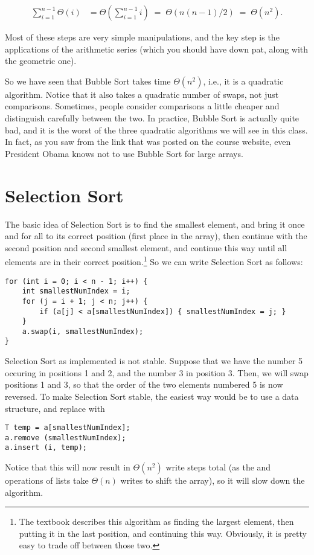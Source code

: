 \begin{align*}
\sum_{i=1}^{n-1} \Theta (i) 
& = \Theta ( \sum_{i=1}^{n-1} i )
\;  = \; \Theta ( n (n - 1) / 2)
\;  = \; \Theta ( n^{2} ).
\end{align*}

Most of these steps are very simple manipulations, and the key step is
the applications of the arithmetic series (which you should have down
pat, along with the geometric one). 

So we have seen that Bubble Sort takes time $\Theta(n^2)$, i.e., it is
a quadratic algorithm. Notice that it also takes a quadratic number of
swaps, not just comparisons. Sometimes, people consider comparisons a
little cheaper and distinguish carefully between the two.
In practice, Bubble Sort is actually quite bad, and it is the worst of
the three quadratic algorithms we will see in this class.
In fact, as you saw from the link that was posted on the course
website, even President Obama knows not to use Bubble Sort for large
arrays.

\section{Selection Sort}

The basic idea of Selection Sort is to find the smallest element, and
bring it once and for all to its correct position (first place in the
array), then continue with the second position and second smallest
element, and continue this way until all elements are in their correct
position.\footnote{The textbook describes this algorithm as finding
  the largest element, then putting it in the last position, and
  continuing this way. Obviously, it is pretty easy to trade off
  between those two.}
So we can write Selection Sort as follows:

\begin{verbatim}
for (int i = 0; i < n - 1; i++) {
    int smallestNumIndex = i;
    for (j = i + 1; j < n; j++) {
        if (a[j] < a[smallestNumIndex]) { smallestNumIndex = j; }
    }
    a.swap(i, smallestNumIndex);
}
\end{verbatim}

Selection Sort as implemented is not stable.
Suppose that we have the number 5 occuring in positions 1 and 2, and
the number 3 in position 3. Then, we will swap positions 1 and 3, so
that the order of the two elements numbered 5 is now reversed.
To make Selection Sort stable, the easiest way would be to use a 
 data structure, and replace
 with
\begin{verbatim}
T temp = a[smallestNumIndex];
a.remove (smallestNumIndex);
a.insert (i, temp);
\end{verbatim}
Notice that this will now result in $\Theta(n^2)$ write steps total
(as the  and  operations of lists take
$\Theta(n)$ writes to shift the array), so it will slow down the
algorithm.

